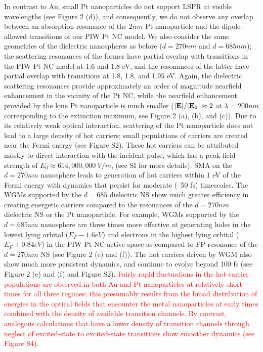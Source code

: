 \documentclass[journal=jpclcd,manuscript=article]{achemso}
\begin{document}
In contrast to Au, small Pt nanoparticles do not support LSPR at visible wavelengths (see Figure 2 (d)), and consequently, we do not
observe any overlap between an absorption resonance of the $2nm$ Pt nanoparticle and the dipole-allowed 
transitions of our PIW Pt NC model.  We also consider
the same geometries of the dielectric nanospheres as before ($d=270nm$ and $d=685 nm$); the scattering resonances of the former have partial overlap with transitions in the PIW Pt NC model at 1.6 and 1.8 eV, and the resonances of the latter have partial 
overlap with transitions at 1.8, 1.8, and 1.95 eV.  Again, the dielectric scattering resonances provide 
approximately an order of magnitude 
nearfield enhancement in the vicinity of the Pt NC, while the nearfield enhancement provided by the lone 
Pt nanoparticle is much smaller ($|{\bf E}|/|{\bf E_0}| \approx 2$ at $\lambda=200nm$ corresponding to the extinction maximum, see Figure 2 (a), (b), and (c)).
Due to its relatively weak optical interaction, scattering of the Pt nanoparticle does not lead to a large density of hot carriers; small populations
of carriers are created near the Fermi energy (see Figure S2).  These hot carriers can be attributed mostly to direct interaction with the 
incident pulse, which has a peak field strength of $E_0 \approx 614,000,000 \: V/m$, (see SI for more details).
SMA on the $d=270nm$ nanosphere
leads to generation of hot carriers within 1 eV of the Fermi energy with dynamics that persist for moderate (~50 fs) timescales.
The WGMs supported by the $d=685$ dielectric NS show much greater efficiency in creating energetic carriers compared
to the resonances of the $d=270nm$ dielectric NS or the Pt nanoparticle.  For example, WGMs supported by the $d=685nm$ nanosphere are three times
more effective at generating holes in the lowest lying orbital ($E_F - 1.6 eV$) 
and electrons in the highest 
lying orbital ($E_F + 0.84 eV$) in the PIW Pt NC active space as compared to FP resonance of the $d=270nm$ NS (see Figure 2 (e) and (f)).  
The hot carriers driven by WGM also show much more persistent dynamics, and continue to evolve beyond 100 fs (see Figure 2 (e) and (f) and Figure S2).  \textcolor{red}{Fairly rapid fluctuations in the hot-carrier populations 
are observed in both Au and Pt nanoparticles at relatively short times for all three regimes; this presumably results from the
broad distribution of energies in the optical fields that encounter the metal nanoparticles 
at early times combined with
the density of available transition channels.  By contrast, analogous calculations that have a lower density of
transition channels through neglect of excited-state to excited-state transitions show smoother dynamics
(see Figure S4).}
\end{document}
